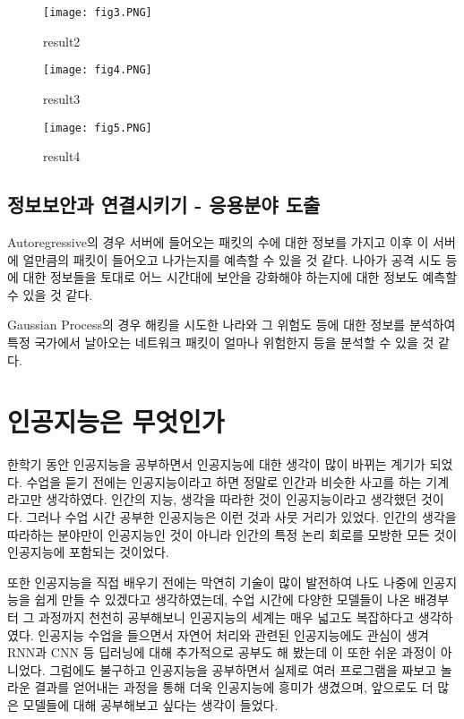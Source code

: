 \documentclass[manuscript,screen,review]{acmart}
\begin{document}
\begin{figure}[h] %
\begin{center}
\texttt{[image: fig3.PNG]}
\end{center}
\caption{result2}
\label{fig:long}
\label{fig:onecol}
\end{figure}

\begin{figure}[h] %
\begin{center}
\texttt{[image: fig4.PNG]}
\end{center}
\caption{result3}
\label{fig:long}
\label{fig:onecol}
\end{figure}

\begin{figure}[h] %
\begin{center}
\texttt{[image: fig5.PNG]}
\end{center}
\caption{result4}
\label{fig:long}
\label{fig:onecol}
\end{figure}

\subsection{정보보안과 연결시키기 - 응용분야 도출}

Autoregressive의 경우 서버에 들어오는 패킷의 수에 대한 정보를 가지고 이후 이 서버에 얼만큼의 패킷이 들어오고 나가는지를 예측할 수 있을 것 같다. 나아가 공격 시도 등에 대한 정보들을 토대로 어느 시간대에 보안을 강화해야 하는지에 대한 정보도 예측할 수 있을 것 같다.

Gaussian Process의 경우 해킹을 시도한 나라와 그 위험도 등에 대한 정보를 분석하여 특정 국가에서 날아오는 네트워크 패킷이 얼마나 위험한지 등을 분석할 수 있을 것 같다.

\section{인공지능은 무엇인가}

한학기 동안 인공지능을 공부하면서 인공지능에 대한 생각이 많이 바뀌는 계기가 되었다. 수업을 듣기 전에는 인공지능이라고 하면 정말로 인간과 비슷한 사고를 하는 기계라고만 생각하였다. 인간의 지능, 생각을 따라한 것이 인공지능이라고 생각했던 것이다. 그러나 수업 시간 공부한 인공지능은 이런 것과 사뭇 거리가 있었다. 인간의 생각을 따라하는 분야만이 인공지능인 것이 아니라 인간의 특정 논리 회로를 모방한 모든 것이 인공지능에 포함되는 것이었다.

또한 인공지능을 직접 배우기 전에는 막연히 기술이 많이 발전하여 나도 나중에 인공지능을 쉽게 만들 수 있겠다고 생각하였는데, 수업 시간에 다양한 모델들이 나온 배경부터 그 과정까지 천천히 공부해보니 인공지능의 세계는 매우 넓고도 복잡하다고 생각하였다. 인공지능 수업을 들으면서 자연어 처리와 관련된 인공지능에도 관심이 생겨 RNN과 CNN 등 딥러닝에 대해 추가적으로 공부도 해 봤는데 이 또한 쉬운 과정이 아니었다. 그럼에도 불구하고 인공지능을 공부하면서 실제로 여러 프로그램을 짜보고 놀라운 결과를 얻어내는 과정을 통해 더욱 인공지능에 흥미가 생겼으며, 앞으로도 더 많은 모델들에 대해 공부해보고 싶다는 생각이 들었다.
\end{document}
